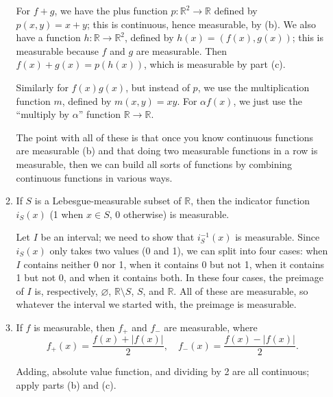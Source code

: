 \documentclass{article}
\let\take\setminus
\begin{document}
\begin{enumerate}
\begin{enumerate}
{							For $f+g$, we have the plus function $p:\mathbb{R}^2\to \mathbb{R}$ defined by $p(x,y)=x+y$; this is continuous, hence measurable, by (b). We also have a function $h:\mathbb{R}\to\mathbb{R}^2$, defined by $h(x)=(f(x),g(x))$; this is measurable because $f$ and $g$ are measurable. Then $f(x)+g(x)=p(h(x))$, which is measurable by part (c).
							
							Similarly for $f(x)g(x)$, but instead of $p$, we use the multiplication function $m$, defined by $m(x,y)=xy$. For $\alpha f(x)$, we just use the ``multiply by $\alpha$'' function $\mathbb{R}\to\mathbb{R}$.
							
							The point with all of these is that once you know continuous functions are measurable (b) and that doing two measurable functions in a row is measurable, then we can build all sorts of functions by combining continuous functions in various ways.
						}
					
			\item If $S$ is a Lebesgue-measurable subset of $\mathbb{R}$, then the indicator function $i_S(x)$ (1 when $x\in S$, 0 otherwise) is measurable.
			
						{\color{blue}
							Let $I$ be an interval; we need to show that $i_S^{-1}(x)$ is measurable. Since $i_S(x)$ only takes two values (0 and 1), we can split into four cases: when $I$ contains neither 0 nor 1, when it contains 0 but not 1, when it contains 1 but not 0, and when it contains both. In these four cases, the preimage of $I$ is, respectively, $\varnothing$, $\mathbb{R}\take S$, $S$, and $\mathbb{R}$. All of these are measurable, so whatever the interval we started with, the preimage is measurable.
						}
					
			\item If $f$ is measurable, then $f_+$ and $f_-$ are measurable, where
				\[f_+(x) = \frac{f(x)+|f(x)|}{2},\quad f_-(x)=\frac{f(x)-|f(x)|}{2}.\]
				
						{\color{blue}
							Adding, absolute value function, and dividing by 2 are all continuous; apply parts (b) and (c).
						}
					

\end{enumerate}
\end{enumerate}
\end{document}
